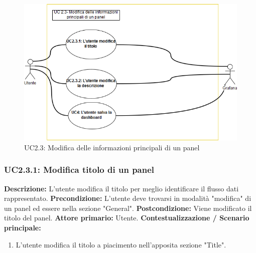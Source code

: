                    \begin{figure}[!htbp]
                    	\centering
                    	\includegraphics[width=\textwidth]{UC2-3.png}
                    	\caption{UC2.3:  Modifica delle informazioni principali di un panel}
                    	\label{uc2.3}
                    \end{figure}
                    
                \subsubsection{UC2.3.1: Modifica titolo di un panel}
                    \textbf{Descrizione:} L’utente modifica il titolo per meglio identificare il flusso dati rappresentato.
                    \newline
                    \textbf{Precondizione:} L'utente deve trovarsi in modalità "modifica" di un panel ed essere nella sezione "General".
                    \newline
                    \textbf{Postcondizione:} Viene modificato il titolo del panel.
                    \newline
                    \textbf{Attore primario:} Utente.
                    \newline
                    \textbf{Contestualizzazione / Scenario principale:} \begin{enumerate}
                        \item L’utente modifica il titolo a piacimento nell'apposita sezione "Title".
                    \end{enumerate}
                
